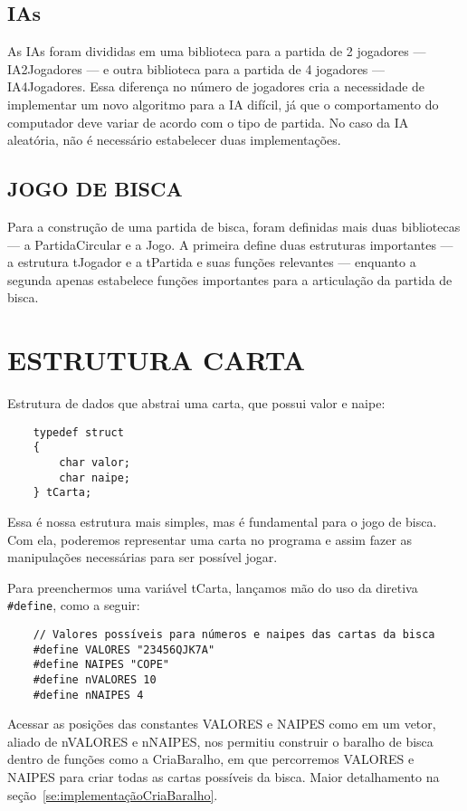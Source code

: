 \documentclass[12pt, oneside, a4paper, brazil]{abntex2}
\begin{document}
\subsection{IAs}
As IAs foram divididas em uma biblioteca para a partida de 2 jogadores --- IA2Jogadores --- e outra biblioteca para a partida de 4 jogadores --- IA4Jogadores. Essa diferença no número de jogadores cria a necessidade de implementar um novo algoritmo para a IA difícil, já que o comportamento do computador deve variar de acordo com o tipo de partida. No caso da IA aleatória, não é necessário estabelecer duas implementações.
\subsection{JOGO DE BISCA}
Para a construção de uma partida de bisca, foram definidas mais duas bibliotecas --- a PartidaCircular e a Jogo. A primeira define duas estruturas importantes --- a estrutura tJogador e a tPartida e suas funções relevantes ---  enquanto a segunda apenas estabelece funções importantes para a articulação da partida de bisca.

\section{ESTRUTURA CARTA}\label{tadCarta}

Estrutura de dados que abstrai uma carta, que possui valor e naipe:
\begin{lstlisting}
    typedef struct
    {
        char valor;
        char naipe;
    } tCarta;
\end{lstlisting}

Essa é nossa estrutura mais simples, mas é fundamental para o jogo de bisca. Com ela, poderemos representar uma carta no programa e assim fazer as manipulações necessárias para ser possível jogar.

Para preenchermos uma variável tCarta, lançamos mão do uso da diretiva \texttt{\#define}, como a seguir:
\begin{lstlisting}
    // Valores possíveis para números e naipes das cartas da bisca
    #define VALORES "23456QJK7A"
    #define NAIPES "COPE"
    #define nVALORES 10
    #define nNAIPES 4
\end{lstlisting}


Acessar as posições das constantes VALORES e NAIPES como em um vetor, aliado de nVALORES e nNAIPES, nos permitiu construir o baralho de bisca dentro de funções como a CriaBaralho, em que percorremos VALORES e NAIPES para criar todas as cartas possíveis da bisca. Maior detalhamento na seção~\ref{se:implementaçãoCriaBaralho}.
\end{document}
